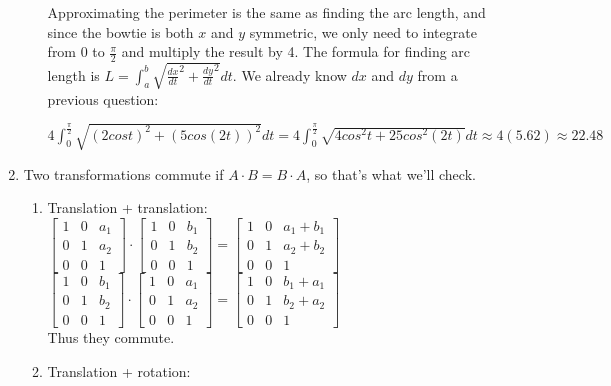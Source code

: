 \documentclass[12pt]{article}
\begin{document}
\begin{enumerate}
\begin{enumerate}
Approximating the perimeter is the same as finding the arc length, and since the bowtie is both $x$ and $y$ symmetric, we only need to integrate from 0 to $\frac{\pi}{2}$ and multiply the result by 4. The formula for finding arc length is $L = \int_a^b \sqrt{\frac{dx}{dt}^2 + \frac{dy}{dt}^2}dt$. We already know $dx$ and $dy$ from a previous question:\begin{center}
$4\int_0^\frac{\pi}{2} \sqrt{(2cost)^2 + (5cos(2t))^2}dt = 4\int_0^\frac{\pi}{2} \sqrt{4cos^2t + 25cos^2(2t)}dt\approx 4(5.62)\approx 22.48 $
\end{center}
\end{enumerate}
\item
Two transformations commute if $A\cdot B = B\cdot A$, so that's what we'll check.
\begin{enumerate}
\item %
Translation + translation:\\
$\begin{bmatrix}
1 & 0 & a_1\\
0 & 1 & a_2\\
0 & 0 & 1
\end{bmatrix}\cdot \begin{bmatrix}
1 & 0 & b_1\\
0 & 1 & b_2\\
0 & 0 & 1
\end{bmatrix} = \begin{bmatrix}
1 & 0 & a_1 + b_1\\
0 & 1 & a_2 + b_2\\
0 & 0 & 1
\end{bmatrix}$\\
$\begin{bmatrix}
1 & 0 & b_1\\
0 & 1 & b_2\\
0 & 0 & 1
\end{bmatrix}\cdot \begin{bmatrix}
1 & 0 & a_1\\
0 & 1 & a_2\\
0 & 0 & 1
\end{bmatrix} = \begin{bmatrix}
1 & 0 & b_1 + a_1\\
0 & 1 & b_2 + a_2\\
0 & 0 & 1
\end{bmatrix}$\\ Thus they commute.
\item %
Translation + rotation:\\

\end{enumerate}
\end{enumerate}
\end{document}

